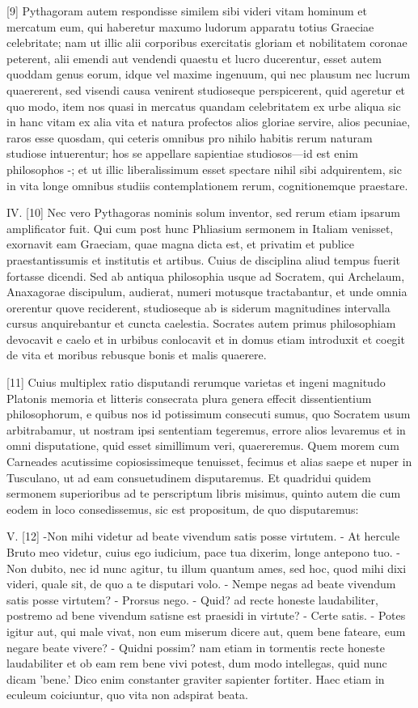 \documentclass[11pt,b5paper,twoside]{book}
\begin{document}
[9] Pythagoram autem respondisse similem sibi videri vitam hominum et mercatum eum, qui haberetur maxumo ludorum apparatu totius Graeciae celebritate; nam ut illic alii corporibus exercitatis gloriam et nobilitatem coronae peterent, alii emendi aut vendendi quaestu et lucro ducerentur, esset autem quoddam genus eorum, idque vel maxime ingenuum, qui nec plausum nec lucrum quaererent, sed visendi causa venirent studioseque perspicerent, quid ageretur et quo modo, item nos quasi in mercatus quandam celebritatem ex urbe aliqua sic in hanc vitam ex alia vita et natura profectos alios gloriae servire, alios pecuniae, raros esse quosdam, qui ceteris omnibus pro nihilo habitis rerum naturam studiose intuerentur; hos se appellare sapientiae studiosos—id est enim philosophos -; et ut illic liberalissimum esset spectare nihil sibi adquirentem, sic in vita longe omnibus studiis contemplationem rerum, cognitionemque praestare.

IV. [10] Nec vero Pythagoras nominis solum inventor, sed rerum etiam ipsarum amplificator fuit. Qui cum post hunc Phliasium sermonem in Italiam venisset, exornavit eam Graeciam, quae magna dicta est, et privatim et publice praestantissumis et institutis et artibus. Cuius de disciplina aliud tempus fuerit fortasse dicendi. Sed ab antiqua philosophia usque ad Socratem, qui Archelaum, Anaxagorae discipulum, audierat, numeri motusque tractabantur, et unde omnia orerentur quove reciderent, studioseque ab is siderum magnitudines intervalla cursus anquirebantur et cuncta caelestia. Socrates autem primus philosophiam devocavit e caelo et in urbibus conlocavit et in domus etiam introduxit et coegit de vita et moribus rebusque bonis et malis quaerere.

[11] Cuius multiplex ratio disputandi rerumque varietas et ingeni magnitudo Platonis memoria et litteris consecrata plura genera effecit dissentientium philosophorum, e quibus nos id potissimum consecuti sumus, quo Socratem usum arbitrabamur, ut nostram ipsi sententiam tegeremus, errore alios levaremus et in omni disputatione, quid esset simillimum veri, quaereremus. Quem morem cum Carneades acutissime copiosissimeque tenuisset, fecimus et alias saepe et nuper in Tusculano, ut ad eam consuetudinem disputaremus. Et quadridui quidem sermonem superioribus ad te perscriptum libris misimus, quinto autem die cum eodem in loco consedissemus, sic est propositum, de quo disputaremus:

V. [12] -Non mihi videtur ad beate vivendum satis posse virtutem. - At hercule Bruto meo videtur, cuius ego iudicium, pace tua dixerim, longe antepono tuo. - Non dubito, nec id nunc agitur, tu illum quantum ames, sed hoc, quod mihi dixi videri, quale sit, de quo a te disputari volo. - Nempe negas ad beate vivendum satis posse virtutem? - Prorsus nego. - Quid? ad recte honeste laudabiliter, postremo ad bene vivendum satisne est praesidi in virtute? - Certe satis. - Potes igitur aut, qui male vivat, non eum miserum dicere aut, quem bene fateare, eum negare beate vivere? - Quidni possim? nam etiam in tormentis recte honeste laudabiliter et ob eam rem bene vivi potest, dum modo intellegas, quid nunc dicam 'bene.' Dico enim constanter graviter sapienter fortiter. Haec etiam in eculeum coiciuntur, quo vita non adspirat beata.
\end{document}
